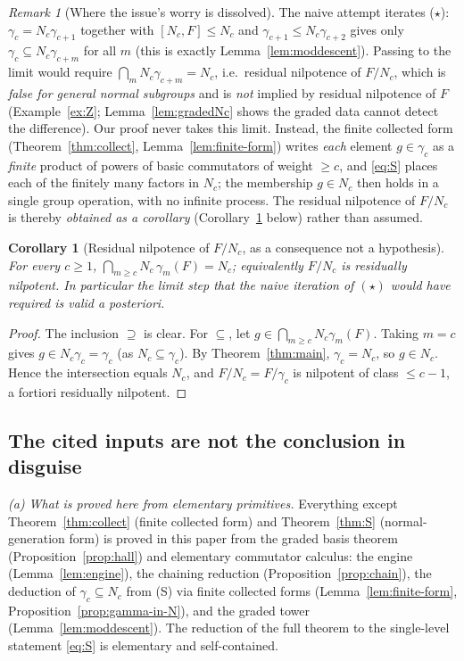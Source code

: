 \documentclass{amsart}
\newtheorem{corollary}{Corollary}
\theoremstyle{definition}
\theoremstyle{remark}
\newtheorem{remark}{Remark}
\begin{document}
\begin{remark}[Where the issue's worry is dissolved]\label{rem:issue}
The naive attempt iterates ($\star$): $\gamma_c=N_c\gamma_{c+1}$ together with
$[N_c,F]\le N_c$ and $\gamma_{c+1}\le N_c\gamma_{c+2}$ gives only
$\gamma_c\subseteq N_c\gamma_{c+m}$ for all $m$ (this is exactly
Lemma~\ref{lem:moddescent}). Passing to the limit would require
$\bigcap_m N_c\gamma_{c+m}=N_c$, i.e.\ residual nilpotence of $F/N_c$, which is
\emph{false for general normal subgroups} and is \emph{not} implied by residual
nilpotence of $F$ (Example~\ref{ex:Z}; Lemma~\ref{lem:gradedNc} shows the graded
data cannot detect the difference). Our proof never takes this limit. Instead, the
finite collected form (Theorem~\ref{thm:collect}, Lemma~\ref{lem:finite-form})
writes \emph{each} element $g\in\gamma_c$ as a \emph{finite} product of powers of
basic commutators of weight $\ge c$, and \eqref{eq:S} places each of the finitely
many factors in $N_c$; the membership $g\in N_c$ then holds in a single group
operation, with no infinite process. The residual nilpotence of $F/N_c$ is thereby
\emph{obtained as a corollary} (Corollary~\ref{cor:resnilp} below) rather than
assumed.
\end{remark}

\begin{corollary}[Residual nilpotence of $F/N_c$, as a consequence not a hypothesis]
\label{cor:resnilp}
For every $c\ge1$, $\bigcap_{m\ge c} N_c\,\gamma_m(F)=N_c$; equivalently $F/N_c$ is
residually nilpotent. In particular the limit step that the naive iteration of
$(\star)$ would have required is valid \emph{a posteriori}.
\end{corollary}
\begin{proof}
The inclusion $\supseteq$ is clear. For $\subseteq$, let
$g\in\bigcap_{m\ge c}N_c\gamma_m(F)$. Taking $m=c$ gives $g\in N_c\gamma_c=\gamma_c$
(as $N_c\subseteq\gamma_c$). By Theorem~\ref{thm:main}, $\gamma_c=N_c$, so
$g\in N_c$. Hence the intersection equals $N_c$, and $F/N_c=F/\gamma_c$ is
nilpotent of class $\le c-1$, a fortiori residually nilpotent.
\end{proof}

\subsection{The cited inputs are not the conclusion in disguise}

\emph{(a) What is proved here from elementary primitives.} Everything except
Theorem~\ref{thm:collect} (finite collected form) and Theorem~\ref{thm:S}
(normal-generation form) is proved in this paper from the graded basis theorem
(Proposition~\ref{prop:hall}) and elementary commutator calculus: the engine
(Lemma~\ref{lem:engine}), the chaining reduction
(Proposition~\ref{prop:chain}), the deduction of $\gamma_c\subseteq N_c$ from (S)
via finite collected forms (Lemma~\ref{lem:finite-form},
Proposition~\ref{prop:gamma-in-N}), and the graded tower
(Lemma~\ref{lem:moddescent}). The reduction of the full theorem to the single-level
statement \eqref{eq:S} is elementary and self-contained.
\end{document}
